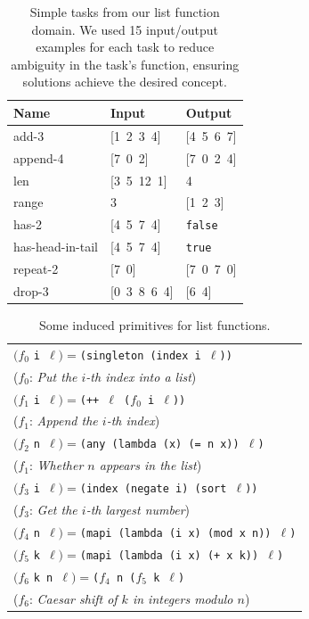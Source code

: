\documentclass{article}
\newcommand{\code}[1]{{\footnotesize\texttt{#1}}}
\begin{document}
\begin{table}
\centering
\begin{tabular}{lll}
  \toprule
  Name & Input & Output \\\midrule
  add-3 & [1\, 2\, 3\, 4] & [4\, 5\, 6\, 7] \\
  append-4 & [7\, 0\, 2] & [7\, 0\, 2\, 4] \\
  len & [3\, 5\, 12\, 1] & 4 \\
  range & 3 & [1\, 2\, 3] \\
  has-2 & [4\, 5\, 7\, 4] & \code{false} \\
  has-head-in-tail & [4\, 5\, 7\, 4] & \code{true} \\
  repeat-2 & [7\, 0] & [7\, 0\, 7\, 0] \\
  drop-3 & [0\, 3\, 8\, 6\, 4] & [6\, 4] \\
  \bottomrule
\end{tabular}
\caption{Simple tasks from our list function domain. We used 15 input/output
  examples for each task to reduce ambiguity in the task's function,
  ensuring solutions achieve the desired concept.}
\label{listexamples}
\end{table}

\begin{table}[t]
  \centering
  \begin{tabular}{l}
    \toprule
    $(f_0$ \code{i $\ell$}$) = $\code{(singleton (index i $\ell$))}\\
    \hspace{0.5cm}($f_0$: \emph{Put the $i$-th index into a list})\\
    $(f_1$ \code{i $\ell$}$) = $\code{(++ $\ell$ ($f_0$ i $\ell$))}\\
    \hspace{0.5cm}($f_1$: \emph{Append the $i$-th index})\\
    $(f_2$ \code{n $\ell$}$) = $\code{(any (lambda (x) (= n x)) $\ell$)}\\
    \hspace{0.5cm}($f_1$: \emph{Whether $n$ appears in the list})\\
    $(f_3$ \code{i $\ell$}$) = $\code{(index (negate i) (sort $\ell$))}\\
    \hspace{0.5cm}($f_3$: \emph{Get the $i$-th largest number})\\
    $(f_4$ \code{n $\ell$}$) = $\code{(mapi (lambda (i x) (mod x n)) $\ell$)}\\
    $(f_5$ \code{k $\ell$}$) = $\code{(mapi (lambda (i x) (+ x k)) $\ell$)}\\
    $(f_6$ \code{k n $\ell$}$) = $\code{($f_4$ n ($f_5$ k $\ell$)}\\
    \hspace{0.5cm}($f_6$: \emph{Caesar shift of $k$ in integers modulo $n$})\\
  \bottomrule
  \end{tabular}
  \caption{Some induced primitives for list functions.}\label{listinduced}
\end{table}
\end{document}
